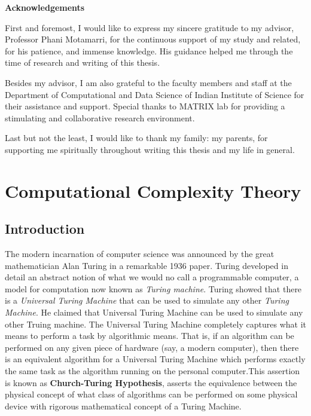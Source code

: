 \documentclass[12pt, oneside]{book}
\theoremstyle{definition}
\theoremstyle{definition}
\theoremstyle{remark}
\newcommand{\acknowledgementsname}{Acknowledgements}
\newenvironment{Acknowledgements}{%
\clearpage
\null\vfill
\begin{center}%
    \bfseries \acknowledgementsname
\end{center}}%
{\vfill\null}
\begin{document}
\begin{Acknowledgements}
First and foremost, I would like to express my sincere gratitude to my advisor,
Professor Phani Motamarri, for the continuous support of my study and related, for
his patience, and immense knowledge.
His guidance helped me through the time of research and writing of this thesis.

Besides my advisor, I am also grateful to the faculty members and staff at the
Department of Computational and Data Science of Indian Institute of Science for
their assistance and support. Special thanks to MATRIX lab for providing a stimulating
and collaborative research environment.

Last but not the least, I would like to thank my family: my parents,
for supporting me spiritually throughout writing this thesis and my life in general.
\end{Acknowledgements}

\tableofcontents

\mainmatter
\chapter{Computational Complexity Theory}
\section{Introduction}
The modern incarnation of computer science was announced by the great mathematician Alan Turing in a remarkable 1936 paper. Turing developed in detail an abstract notion of what we would no call a programmable computer, a model for computation now known as \textit{Turing machine}. Turing showed that there is a \textit{Universal Turing Machine} that can be used to simulate any other \textit{Turing Machine}. He claimed that Universal Turing Machine can be used to simulate any other Truing machine. The Universal Turing Machine completely captures what it means to perform a task by algorithmic means. That is, if an algorithm can be performed on any given piece of hardware (say, a modern computer), then there is an equivalent algorithm for a Universal Turing Machine which performs exactly the same task as the algorithm running on the personal computer.This assertion is known as \textbf{Church-Turing Hypothesis}, asserts the equivalence between the physical concept of what class of algorithms can be performed on some physical device with rigorous mathematical concept of a Turing Machine.
\end{document}

